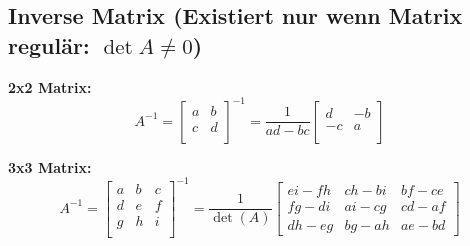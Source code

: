 \subsection{Inverse Matrix \small{(Existiert nur wenn Matrix regulär: $\det A \neq 0$)}}
\begin{minipage}{7cm}
	\textbf{2x2 Matrix:}    
	$$ A^{-1} = \begin{bmatrix} a & b \\ c & d \\ \end{bmatrix}^{-1} = \frac{1}{ad
	- bc} \begin{bmatrix} d & -b \\ -c & a \\ \end{bmatrix} $$
\end{minipage}
\begin{minipage}{11cm}
	\textbf{3x3 Matrix:}
  $$  A^{-1} = \begin{bmatrix} a & b & c\\ d & e & f \\ g & h & i \\ \end{bmatrix}^{-1} =
  \frac{1}{\det(A)} \begin{bmatrix} ei - fh & ch - bi & bf - ce \\ fg - di & ai
  - cg & cd - af \\ dh - eg & bg - ah & ae - bd \end{bmatrix} $$
\end{minipage}\\

